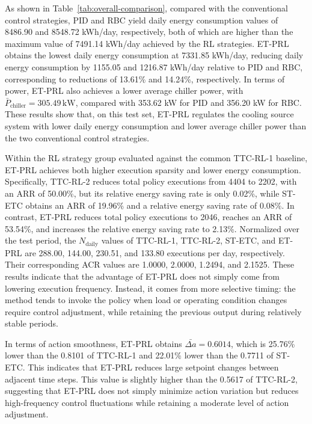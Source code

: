 \documentclass[preprint,12pt]{elsarticle}
\begin{document}
As shown in Table~\ref{tab:overall-comparison}, compared with the conventional control strategies, PID and RBC yield daily energy consumption values of 8486.90 and 8548.72 kWh/day, respectively, both of which are higher than the maximum value of 7491.14 kWh/day achieved by the RL strategies. ET-PRL obtains the lowest daily energy consumption at 7331.85 kWh/day, reducing daily energy consumption by 1155.05 and 1216.87 kWh/day relative to PID and RBC, corresponding to reductions of 13.61\% and 14.24\%, respectively. In terms of power, ET-PRL also achieves a lower average chiller power, with \(\bar{P}_{\text{chiller}}=305.49\,\mathrm{kW}\), compared with 353.62 kW for PID and 356.20 kW for RBC. These results show that, on this test set, ET-PRL regulates the cooling source system with lower daily energy consumption and lower average chiller power than the two conventional control strategies.

Within the RL strategy group evaluated against the common TTC-RL-1 baseline, ET-PRL achieves both higher execution sparsity and lower energy consumption. Specifically, TTC-RL-2 reduces total policy executions from 4404 to 2202, with an ARR of 50.00\%, but its relative energy saving rate is only 0.02\%, while ST-ETC obtains an ARR of 19.96\% and a relative energy saving rate of 0.08\%. In contrast, ET-PRL reduces total policy executions to 2046, reaches an ARR of 53.54\%, and increases the relative energy saving rate to 2.13\%. Normalized over the test period, the \(N_{\text{daily}}\) values of TTC-RL-1, TTC-RL-2, ST-ETC, and ET-PRL are 288.00, 144.00, 230.51, and 133.80 executions per day, respectively. Their corresponding ACR values are 1.0000, 2.0000, 1.2494, and 2.1525. These results indicate that the advantage of ET-PRL does not simply come from lowering execution frequency. Instead, it comes from more selective timing: the method tends to invoke the policy when load or operating condition changes require control adjustment, while retaining the previous output during relatively stable periods.

In terms of action smoothness, ET-PRL obtains \(\bar{\Delta a}=0.6014\), which is 25.76\% lower than the 0.8101 of TTC-RL-1 and 22.01\% lower than the 0.7711 of ST-ETC. This indicates that ET-PRL reduces large setpoint changes between adjacent time steps. This value is slightly higher than the 0.5617 of TTC-RL-2, suggesting that ET-PRL does not simply minimize action variation but reduces high-frequency control fluctuations while retaining a moderate level of action adjustment.
\end{document}
